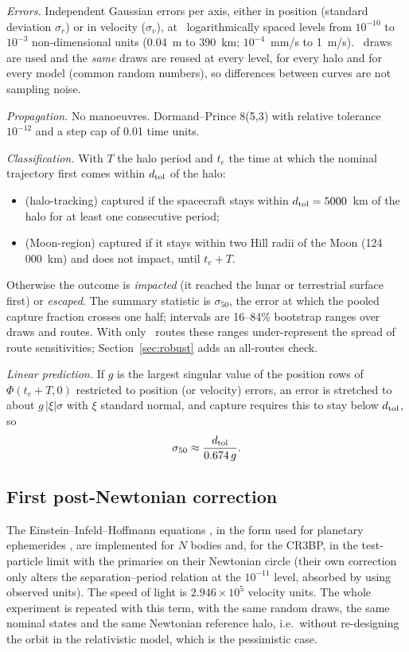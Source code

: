 \documentclass[11pt,a4paper]{article}
\begin{document}
\emph{Errors.} Independent Gaussian errors per axis, either in position (standard deviation $\sigma_r$) or in
velocity ($\sigma_v$), at \NLevels\ logarithmically spaced levels from $10^{-10}$ to $10^{-3}$ non-dimensional
units (0.04~m to 390~km; $10^{-4}$~mm/s to 1~m/s). \NSamples\ draws are used and the \emph{same} draws are reused
at every level, for every halo and for every model (common random numbers), so differences between curves are
not sampling noise.

\emph{Propagation.} No manoeuvres. Dormand--Prince 8(5,3) with relative tolerance $10^{-12}$ and a step cap of
0.01 time units.

\emph{Classification.} With $T$ the halo period and $t_e$ the time at which the nominal trajectory first comes
within $d_{\rm tol}$ of the halo:
\begin{itemize}\setlength\itemsep{1pt}
\item[\textbf{A}] (halo-tracking) captured if the spacecraft stays within $d_{\rm tol}=5000$~km of the halo
for at least one consecutive period;
\item[\textbf{B}] (Moon-region) captured if it stays within two Hill radii of the Moon (124\,000~km) and does
not impact, until $t_e+T$.
\end{itemize}
Otherwise the outcome is \emph{impacted} (it reached the lunar or terrestrial surface first) or \emph{escaped}.
The summary statistic is $\sigma_{50}$, the error at which the pooled capture fraction crosses one half;
intervals are 16--84\% bootstrap ranges over draws and routes. With only \NPhases\ routes these ranges under-represent the spread of route sensitivities; Section~\ref{sec:robust} adds an all-routes check.

\emph{Linear prediction.} If $g$ is the largest singular value of the position rows of $\Phi(t_e+T,0)$ restricted to position
(or velocity) errors, an error is stretched to about $g\,|\xi|\sigma$ with $\xi$ standard normal, and capture
requires this to stay below $d_{\rm tol}$, so
\begin{equation}\label{eq:lin}\sigma_{50}\approx \frac{d_{\rm tol}}{0.674\,g}.\end{equation}

\subsection{First post-Newtonian correction}
The Einstein--Infeld--Hoffmann equations \cite{eih}, in the form used for planetary ephemerides
\cite{assist}, are implemented for $N$ bodies and, for the CR3BP, in the test-particle limit with the primaries
on their Newtonian circle (their own correction only alters the separation--period relation at the $10^{-11}$
level, absorbed by using observed units). The speed of light is $2.946\times10^{5}$ velocity units. The whole
experiment is repeated with this term, with the same random draws, the same nominal states and the same
Newtonian reference halo, i.e.\ without re-designing the orbit in the relativistic model, which is the pessimistic case.
\end{document}
